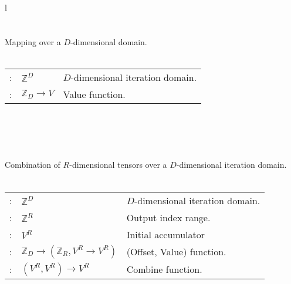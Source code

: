 \begin{figure*}
\fontsize{9}{10}
\selectfont
\begin{tabular}{l}
 \\ \midrule
{} \\
\vspace{-7pt} \\
Mapping over a $D$-dimensional domain. \\
\vspace{-8pt} \\
{
\begin{tabular}{lll}
\argg{d}: &\hspace{-10pt} $\mathbb{Z}^D$  & \hspace{-4pt}$D$-dimensional iteration domain. \\
\argg{m}: &\hspace{-10pt} $\mathbb{Z}_D\rightarrow V$ & \hspace{-4pt}Value function.   \\
\end{tabular}
}
\\
\\
 \\
\vspace{-7pt} \\
Combination of $R$-dimensional tensors over a $D$-dimensional iteration domain. \\
\vspace{-8pt} \\
{
\begin{tabular}{lll}
\argg{d}: &\hspace{-10pt} $\mathbb{Z}^D$ & \hspace{-4pt}$D$-dimensional iteration domain.  \\
\argg{r}: &\hspace{-10pt} $\mathbb{Z}^R$ & \hspace{-4pt}Output index range.         \\
\argg{z}: &\hspace{-10pt} $V^R$          & \hspace{-4pt}Initial accumulator         \\
\argg{f}: &\hspace{-10pt} $\mathbb{Z}_D \rightarrow (\mathbb{Z}_R, V^R \rightarrow V^R)$ & \hspace{-4pt}(Offset, Value) function.    \\
\argg{c}: &\hspace{-10pt} $(V^R, V^R) \rightarrow V^R$& \hspace{-4pt}Combine function.  \\

\end{tabular}}
\end{tabular}
\end{figure*}
